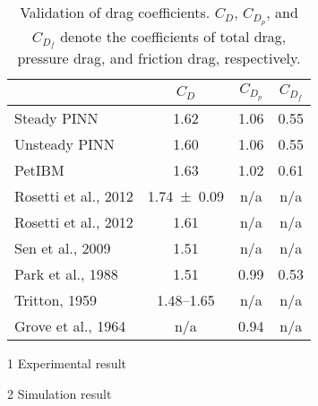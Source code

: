 \begin{table}[h]
    \centering%
    \begin{threeparttable}
        \begin{tabular}{lccc}
            \toprule
            & $C_D$ & $C_{D_p}$ & $C_{D_f}$ \\
            \midrule
            Steady PINN & 1.62 & 1.06 & 0.55 \\
            Unsteady PINN & 1.60 & 1.06 & 0.55 \\
            PetIBM & 1.63 & 1.02 & 0.61 \\
            Rosetti et al., 2012\cite{rosetti_urans_2012}\tnote{1} & \num{1.74+-0.09} & n/a & n/a \\
            Rosetti et al., 2012\cite{rosetti_urans_2012}\tnote{2} & 1.61 & n/a & n/a \\
            Sen et al., 2009\cite{sen_steady_2009}\tnote{2} & 1.51 & n/a & n/a \\
            Park et al., 1988\cite{park_numerical_1998}\tnote{2} & 1.51 & 0.99 & 0.53 \\
            Tritton, 1959\cite{tritton_experiments_1959}\tnote{1} & 1.48--1.65 & n/a & n/a \\
            Grove et al., 1964\cite{grove_experimental_1964}\tnote{1} & n/a & 0.94 & n/a \\
            \bottomrule
        \end{tabular}%
        \begin{tablenotes}
            \footnotesize
            \item [1] Experimental result
            \item [2] Simulation result
        \end{tablenotes}
        \caption{%
            Validation of drag coefficients. %
            $C_D$, $C_{D_p}$, and $C_{D_f}$ denote the coefficients of total drag, pressure drag, %
            and friction drag, respectively.%
        }%
        \label{table:cylinder-re40-cd-comparison}
    \end{threeparttable}
\end{table}%



